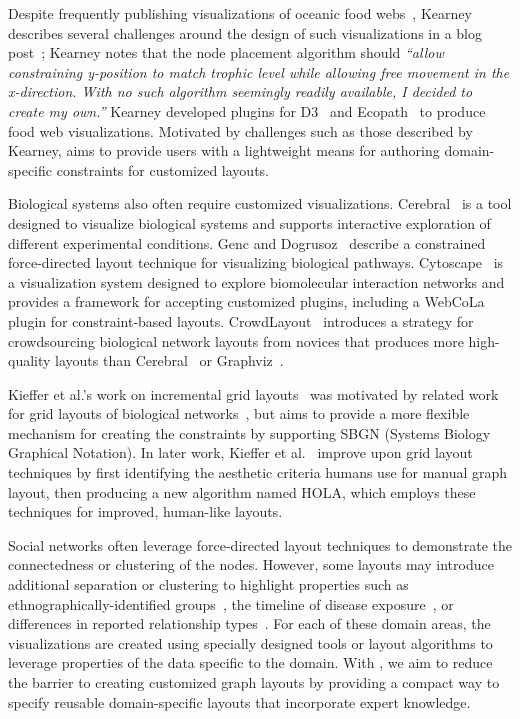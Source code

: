 Despite frequently publishing visualizations of oceanic food 
webs~\cite{kearney2012coupling,kearney2013amplification},
Kearney describes several challenges around the design of such visualizations
in a blog post~\cite{kearney2016blog}; Kearney notes that the node
placement algorithm should \emph{``allow constraining y-position to match
  trophic level while allowing free movement in the x-direction. With no
  such algorithm seemingly readily available, I decided to create my
  own.''} Kearney developed plugins for D3~\cite{kearney2017d3} and
Ecopath~\cite{kearney2017ecopath} to produce food web visualizations. 
Motivated by challenges such as those
described by Kearney, \projectname aims to provide users
with a lightweight means for authoring domain-specific constraints for customized layouts.

Biological systems also often require customized visualizations.
Cerebral~\cite{barsky2008cerebral} is a tool designed to visualize
biological systems and supports interactive exploration of different
experimental conditions. Genc and Dogrusoz~\cite{genc2003constrained}
describe a constrained force-directed layout technique for visualizing 
biological pathways. Cytoscape~\cite{shannon2003cytoscape} is a
visualization system designed to explore biomolecular interaction networks
and provides a framework for accepting customized plugins, including 
a WebCoLa~\cite{WebCoLa} plugin for constraint-based layouts.
CrowdLayout~\cite{singh2018crowdlayout} introduces a strategy for crowdsourcing 
biological network layouts from novices that produces more high-quality
layouts than Cerebral~\cite{barsky2008cerebral} or Graphviz~\cite{ellson2001graphviz}.

Kieffer et al.'s work on incremental grid layouts~\cite{kieffer2013incremental}
was motivated by related work for grid layouts of biological 
networks~\cite{barsky2008cerebral,kojima2007efficient,li2005grid}, 
but aims to provide a more flexible mechanism for creating the constraints 
by supporting SBGN (Systems Biology Graphical Notation). In later
work, Kieffer et al.~\cite{kieffer2016hola} improve upon grid layout techniques
by first identifying the aesthetic criteria humans use for manual graph layout,
then producing a new algorithm named HOLA, which employs these techniques for improved,
human-like layouts.

Social networks often leverage force-directed layout techniques
to demonstrate the connectedness or clustering of the nodes. However, some
layouts may introduce additional separation or clustering
to highlight properties such as ethnographically-identified groups~\cite{rothenberg1998using},
the timeline of disease
exposure~\cite{fitzpatrick2001preventable,mcelroy2003network},
or differences in reported relationship types~\cite{fu2011hiv}.
For each of these domain areas, the visualizations are created using specially
designed tools or layout algorithms to leverage properties of the data
specific to the domain. With \projectname, we aim to reduce the barrier to
creating customized graph layouts by providing a compact way to specify
reusable domain-specific layouts that incorporate expert knowledge.


